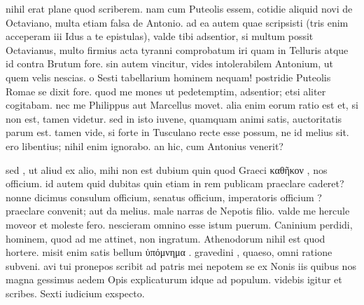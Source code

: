 


 nihil erat plane quod scriberem. nam cum Puteolis essem, cotidie aliquid novi de Octaviano, multa etiam falsa de Antonio. ad ea autem quae scripsisti (tris enim acceperam iii Idus a te epistulas), valde tibi adsentior, si multum possit Octavianus, multo firmius acta tyranni comprobatum iri quam in Telluris atque id contra Brutum fore. sin autem vincitur, vides intolerabilem Antonium, ut quem velis nescias. o Sesti tabellarium hominem nequam! postridie Puteolis Romae se dixit fore. quod me mones ut pedetemptim, adsentior; etsi aliter cogitabam. nec me Philippus aut Marcellus movet. alia enim eorum ratio est et, si non est, tamen videtur. sed in isto iuvene, quamquam animi satis, auctoritatis parum est. tamen vide, si forte in Tusculano recte esse possum, ne id melius sit. ero libentius; nihil enim ignorabo. an hic, cum Antonius venerit?

 sed , ut aliud ex alio, mihi non est dubium quin quod Graeci καθῆκον , nos officium. id autem quid dubitas quin etiam in rem publicam praeclare caderet? nonne dicimus consulum officium, senatus officium, imperatoris officium ? praeclare convenit; aut da melius. male narras de Nepotis filio. valde me hercule moveor et moleste fero. nescieram omnino esse istum puerum. Caninium perdidi, hominem, quod ad me attinet, non ingratum. Athenodorum nihil est quod hortere. misit enim satis bellum ὑπόμνημα . gravedini , quaeso, omni ratione subveni. avi tui pronepos scribit ad patris mei nepotem se ex Nonis iis quibus nos magna gessimus aedem Opis explicaturum idque ad populum. videbis igitur et scribes. Sexti iudicium exspecto.
